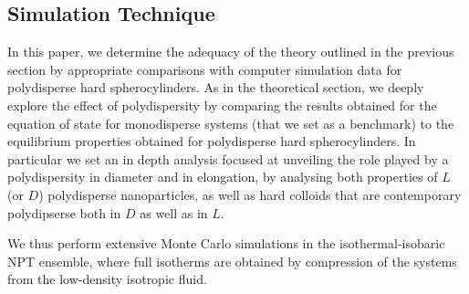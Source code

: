 \documentclass[journal=jacsat,manuscript=article]{achemso}
\begin{document}



\subsection{Simulation Technique}
In this paper, we determine the adequacy of the theory outlined in the previous section by appropriate comparisons with  computer simulation data for polydisperse hard spherocylinders. As in the theoretical section, we deeply explore the effect of polydispersity  by comparing the results obtained for the equation of state for monodisperse systems (that we set as a benchmark) to the equilibrium properties obtained for polydisperse hard spherocylinders. In particular we set an in depth analysis focused at unveiling the role played by a polydispersity in diameter and in elongation, by analysing both properties of $L$ (or $D$) polydisperse nanoparticles, as well as hard colloids that are contemporary polydipserse both in $D$ as well as in $L$. 

We thus perform extensive Monte Carlo simulations in the isothermal-isobaric NPT ensemble, where full isotherms are obtained by compression of the systems from the low-density isotropic fluid.
\end{document}
